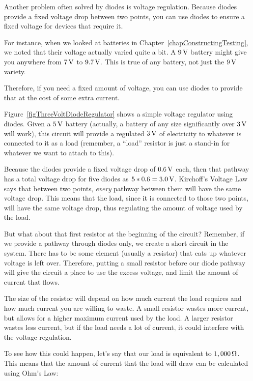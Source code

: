 Another problem often solved by diodes is voltage regulation.
Because diodes provide a fixed voltage drop between two points, you can use diodes to ensure a fixed voltage for devices that require it.

For instance, when we looked at batteries in Chapter~\ref{chapConstructingTesting}, we noted that their voltage actually varied quite a bit.
A $9\,\si{\volt}$ battery might give you anywhere from $7\,\si{\volt}$ to $9.7\,\si{\volt}$.
This is true of any battery, not just the $9\,\si{\volt}$ variety.

Therefore, if you need a fixed amount of voltage, you can use diodes to provide that at the cost of some extra current.

Figure~\ref{figThreeVoltDiodeRegulator} shows a simple voltage regulator using diodes.
Given a $5\,\si{\volt}$ battery (actually, a battery of any size significantly over $3\,\si{\volt}$ will work), this circuit will provide a regulated $3\,\si{\volt}$ of electricity to whatever is connected to it as a load (remember, a ``load'' resistor is just a stand-in for whatever we want to attach to this).

Because the diodes provide a fixed voltage drop of $0.6\,\si{\volt}$ each, then that pathway has a total voltage drop for five diodes as $5 * 0.6 = 3.0\,\si{\volt}$.
Kirchoff's Voltage Law says that between two points, \emph{every} pathway between them will have the same voltage drop.
This means that the load, since it is connected to those two points, will have the same voltage drop, thus regulating the amount of voltage used by the load.

But what about that first resistor at the beginning of the circuit?
Remember, if we provide a pathway through diodes only, we create a short circuit in the system.
There has to be some element (usually a resistor) that eats up whatever voltage is left over.
Therefore, putting a small resistor before our diode pathway will give the circuit a place to use the excess voltage, and limit the amount of current that flows.

The size of the resistor will depend on how much current the load requires and how much current you are willing to waste.
A small resistor wastes more current, but allows for a higher maximum current used by the load.
A larger resistor wastes less current, but if the load needs a lot of current, it could interfere with the voltage regulation.

To see how this could happen, let's say that our load is equivalent to $1,000\,\si{\ohm}$.
This means that the amount of current that the load will draw can be calculated using Ohm's Law:

